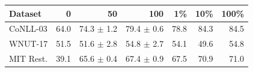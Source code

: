 \begingroup\small\setlength{\tabcolsep}{3pt}
\begin{tabular*}{\linewidth}{@{\extracolsep{\fill}}lrrrrrr@{}}
\toprule
Dataset & 0 & 50 & 100 & 1\% & 10\% & 100\% \\
\midrule
CoNLL-03 & 64.0 & 74.3 $\pm$ 1.2 & 79.4 $\pm$ 0.6 & 78.8 & 84.3 & 84.5 \\
WNUT-17 & 51.5 & 51.6 $\pm$ 2.8 & 54.8 $\pm$ 2.7 & 54.1 & 49.6 & 54.8 \\
MIT Rest. & 39.1 & 65.6 $\pm$ 0.4 & 67.4 $\pm$ 0.9 & 67.5 & 70.9 & 71.0 \\
\bottomrule
\end{tabular*}
\endgroup

